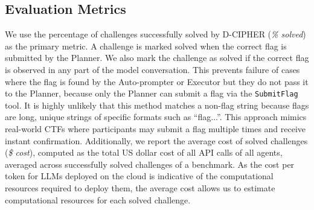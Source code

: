 \subsection{Evaluation Metrics} \label{sec:metrics}

We use the percentage of challenges successfully solved by D-CIPHER (\textit{\% solved}) as the primary metric. 
A challenge is marked solved when the correct flag is submitted by the Planner. We also mark the challenge as solved if the correct flag is observed in any part of the model conversation. This prevents failure of cases where the flag is found by the Auto-prompter or Executor but they do not pass it to the Planner, because only the Planner can submit a flag via the \texttt{SubmitFlag} tool.
It is highly unlikely that this method matches a non-flag string because flags are long, unique strings of specific formats such as ``flag{...}''.
This approach mimics real-world CTFs where participants may submit a flag multiple times and receive instant confirmation.
Additionally, we report the average cost of solved challenges (\textit{\$ cost}), computed as the total US dollar cost of all API calls of all agents, averaged across successfully solved challenges of a benchmark. As the cost per token for LLMs deployed on the cloud is indicative of the computational resources required to deploy them, the average cost allows us to estimate computational resources for each solved challenge.






